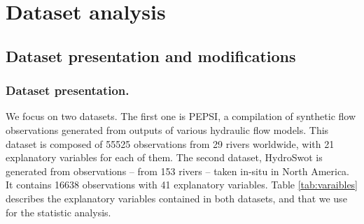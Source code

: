 \section{Dataset analysis}

\subsection{Dataset presentation and modifications}

\subsubsection{Dataset presentation.}

We focus on two datasets. The first one is PEPSI, a compilation of synthetic flow observations generated from outputs of various hydraulic flow models. This dataset is composed of 55525 observations from 29 rivers worldwide, with 21 explanatory variables for each of them. The second dataset, HydroSwot is generated from observations -- from 153 rivers -- taken in-situ in North America. It contains 16638 observations with 41 explanatory variables. Table \ref{tab:varaibles} describes the explanatory variables contained in both datasets, and that we use for the statistic analysis.


